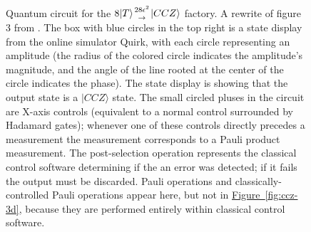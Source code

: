 \documentclass[superscriptaddress,notitlepage,longbibliography]{revtex4-1}
\newcommand{\fig}[1]{\hyperref[fig:#1]{Figure~\ref*{fig:#1}}}
\newcommand{\factory}[3]{$#1 \genfrac{}{}{0pt}{}{#2}{\rightarrow} {#3}$ factory}
\begin{document}
\begin{figure}[ht]
  \label{fig:ccz-circuit}
  \caption{
    Quantum circuit for the \factory{8|T\rangle}{28\epsilon^2}{|CCZ\rangle}.
    A rewrite of figure 3 from \cite{jones2013}.
    The box with blue circles in the top right is a state display from the online simulator Quirk, with each circle representing an amplitude (the radius of the colored circle indicates the amplitude's magnitude, and the angle of the line rooted at the center of the circle indicates the phase).
    The state display is showing that the output state is a $|CCZ\rangle$ state.
    The small circled pluses in the circuit are X-axis controls (equivalent to a normal control surrounded by Hadamard gates); whenever one of these controls directly precedes a measurement the measurement corresponds to a Pauli product measurement.
    The post-selection operation represents the classical control software determining if the an error was detected; if it fails the output must be discarded.
    Pauli operations and classically-controlled Pauli operations appear here, but not in \fig{ccz-3d}, because they are performed entirely within classical control software.
}
\end{figure}
\end{document}
